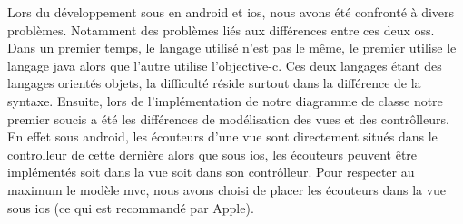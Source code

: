 Lors du développement sous en \gls{android} et \gls{ios}, nous avons été
 confronté à divers problèmes.
Notamment des problèmes liés aux différences entre ces deux \glspl{os}.
Dans un premier temps, le langage utilisé n'est pas le même, le premier utilise
 le langage \gls{java} alors que l'autre utilise l'\gls{objective-c}.
 Ces deux langages étant des langages orientés objets, la difficulté réside
 surtout dans la différence de la syntaxe.
Ensuite, lors de l'implémentation de notre diagramme de classe notre premier
 soucis a été les différences de modélisation des vues et des contrôlleurs.
 En effet sous \gls{android}, les écouteurs d'une vue sont directement situés
 dans le controlleur de cette dernière alors que sous \gls{ios}, les écouteurs
 peuvent être implémentés soit dans la vue soit dans son contrôlleur.
Pour respecter au maximum le modèle \gls{mvc}, nous avons choisi de placer les
écouteurs dans la vue sous \gls{ios} (ce qui est recommandé par Apple). 